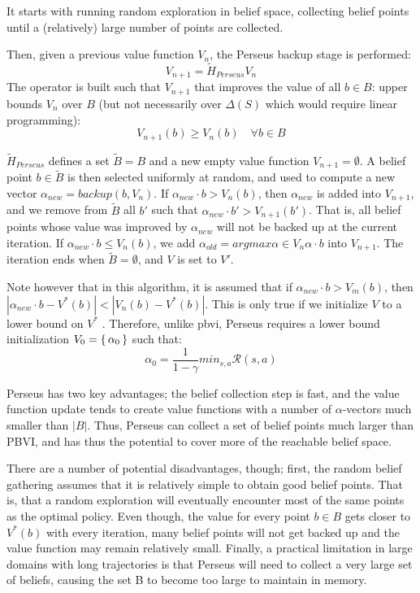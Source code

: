 It starts with running random exploration in belief space, collecting belief points 
until a (relatively) large number of points are collected.

Then, given a previous value function $V_n$, the Perseus backup stage is performed: 
$$V_{n+1} = \tilde{H}_{Perseus} V_n$$ 
The operator is built such that $V_{n+1}$ that improves the value of all $b \in B$:
upper bounds $V_n$ over $B$ (but not necessarily over $\Delta(S)$ which would require linear programming):
$$V_{n+1}(b) \geq V_n(b) \quad \forall b \in B$$

$\tilde{H}_{Perseus}$ defines a set $\tilde{B} = B$ and a new empty
value function $V_{n+1} = \emptyset$. A belief point $b \in \tilde{B}$ is then selected uniformly at random, and used to
compute a new vector $\alpha_{new} = backup(b,V_n)$. If $\alpha_{new}\cdot b > V_n(b)$, then $\alpha_{new}$ is added into
$V_{n+1}$, and we remove from $\tilde{B}$ all $b'$ such that $\alpha_{new} \cdot b' > V_{n+1}(b')$. 
That is, all belief points whose value was improved by $\alpha_{new}$ will not be backed up at the 
current iteration. If $\alpha_{new} \cdot b \leq V_n (b)$, 
we add $\alpha_{old} = argmax \alpha \in V_n \alpha \cdot b$ into $V_{n+1}$. 
The iteration ends when $\tilde{B} = \emptyset$, and $V$ is set to $V'$.

Note however that in this algorithm, it is assumed that if $\alpha_{new} \cdot b > V_m(b)$,
then $|\alpha_{new} \cdot b - V^*(b)| < |V_n(b) - V^* (b)|$. 
This is only true if we initialize $V$ to a lower bound on $V^*$ . Therefore, unlike \gls{pbvi}, 
Perseus requires a lower bound initialization $V_0 = \set{\alpha_0}$ such that:
$$\alpha_0 = \frac{1}{1-\gamma}min_{s,a}\mathcal{R}(s,a)$$

Perseus has two key advantages; the belief collection step is fast, and the value function
update tends to create value functions with a number of $\alpha$-vectors much smaller than $|B|$.
Thus, Perseus can collect a set of belief points much larger than PBVI, and has thus the
potential to cover more of the reachable belief space.

There are a number of potential disadvantages, though; first, the random belief
gathering assumes that it is relatively simple to obtain good belief points. That is, that a
random exploration will eventually encounter most of the same points as the optimal policy.
Even though, the value for every point $b \in B$ gets closer to $V^*(b)$ with every
iteration, many belief points will not get backed up and the value function may remain
relatively small. Finally, a practical limitation in large domains with long trajectories is that Perseus will
need to collect a very large set of beliefs, causing the set B to become too large to maintain in
memory.

